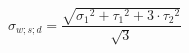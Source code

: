 \documentclass[12pt]{article}
\begin{document}
\begin{displaymath}
\sigma_{w;s;d} = \frac {\sqrt{{\sigma_1}^2 + {\tau_1}^2 + 3 \cdot {\tau_2}^2}} {\sqrt{3}}
\end{displaymath}
\end{document}
